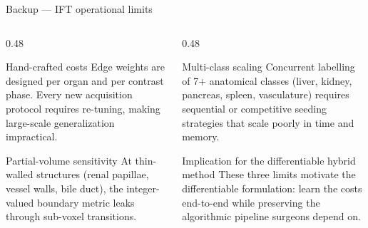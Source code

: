 \documentclass[aspectratio=169,11pt,xcolor=table]{beamer}
\begin{document}
\begin{frame}{Backup --- IFT operational limits}
\footnotesize
\begin{columns}[T]
\begin{column}{0.48\linewidth}
\begin{block}{Hand-crafted costs}
\scriptsize
Edge weights are designed per organ and per contrast phase. Every new acquisition protocol requires re-tuning, making large-scale generalization impractical.
\end{block}
\vspace{0.1cm}
\begin{block}{Partial-volume sensitivity}
\scriptsize
At thin-walled structures (renal papillae, vessel walls, bile duct), the integer-valued boundary metric leaks through sub-voxel transitions.
\end{block}
\end{column}
\begin{column}{0.48\linewidth}
\begin{block}{Multi-class scaling}
\scriptsize
Concurrent labelling of 7+ anatomical classes (liver, kidney, pancreas, spleen, vasculature) requires sequential or competitive seeding strategies that scale poorly in time and memory.
\end{block}
\vspace{0.05cm}
\begin{alertblock}{Implication for the differentiable hybrid method}
\scriptsize
These three limits motivate the differentiable formulation: \alert{learn the costs end-to-end} while preserving the algorithmic pipeline surgeons depend on.
\end{alertblock}
\end{column}
\end{columns}
\vspace{0.1cm}
\end{frame}
\end{document}
